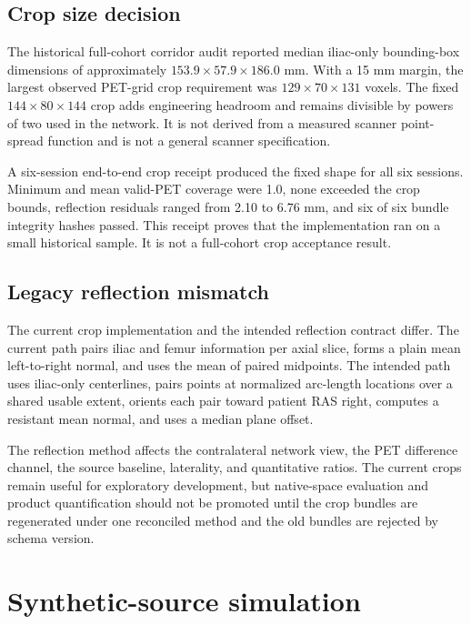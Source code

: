 \documentclass[11pt]{article}
\begin{document}
\subsection{Crop size decision}

The historical full-cohort corridor audit reported median iliac-only bounding-box dimensions of approximately $153.9 \times 57.9 \times 186.0$ mm. With a 15 mm margin, the largest observed PET-grid crop requirement was $129 \times 70 \times 131$ voxels. The fixed $144 \times 80 \times 144$ crop adds engineering headroom and remains divisible by powers of two used in the network. It is not derived from a measured scanner point-spread function and is not a general scanner specification.

A six-session end-to-end crop receipt produced the fixed shape for all six sessions. Minimum and mean valid-PET coverage were 1.0, none exceeded the crop bounds, reflection residuals ranged from 2.10 to 6.76 mm, and six of six bundle integrity hashes passed. This receipt proves that the implementation ran on a small historical sample. It is not a full-cohort crop acceptance result.

\subsection{Legacy reflection mismatch}

The current crop implementation and the intended reflection contract differ. The current path pairs iliac and femur information per axial slice, forms a plain mean left-to-right normal, and uses the mean of paired midpoints. The intended path uses iliac-only centerlines, pairs points at normalized arc-length locations over a shared usable extent, orients each pair toward patient RAS right, computes a resistant mean normal, and uses a median plane offset.

The reflection method affects the contralateral network view, the PET difference channel, the source baseline, laterality, and quantitative ratios. The current crops remain useful for exploratory development, but native-space evaluation and product quantification should not be promoted until the crop bundles are regenerated under one reconciled method and the old bundles are rejected by schema version.

\section{Synthetic-source simulation}
\end{document}
